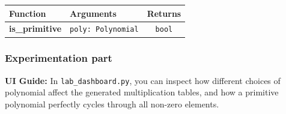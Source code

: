 \begin{center}
\renewcommand{\arraystretch}{1.5}
\begin{tabularx}{\textwidth}{@{} >{\bfseries}l X c @{}}
\toprule
Function & Arguments & Returns \\ \midrule
is\_primitive & \lstinline|poly: Polynomial| & \lstinline|bool| \\
\bottomrule
\end{tabularx}
\end{center}

\subsubsection*{Experimentation part}
\textbf{UI Guide:} In \lstinline|lab_dashboard.py|, you can inspect how different choices of polynomial affect the generated multiplication tables, and how a primitive polynomial perfectly cycles through all non-zero elements.

\vspace{1cm}
